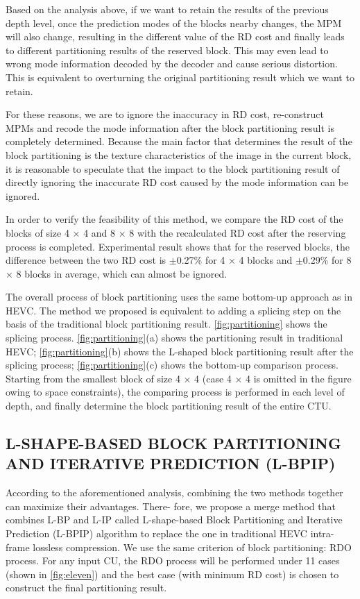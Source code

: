 \documentclass[journal]{IEEEtran}
\begin{document}
Based on the analysis above, if we want to retain the results of the previous depth level, once the prediction modes of the blocks nearby changes, the MPM will also change, resulting in the different value of the RD cost and finally leads to different partitioning results of the reserved block. This may even lead to wrong mode information decoded by the decoder and cause serious distortion. This is equivalent to overturning the original partitioning result which we want to retain.

For these reasons, we are to ignore the inaccuracy in RD cost, re-construct MPMs and recode the mode information after the block partitioning result is completely determined. Because the main factor that determines the result of the block partitioning is the texture characteristics of the image in the current block, it is reasonable to speculate that the impact to the block partitioning result of directly ignoring the inaccurate RD cost caused by the mode information can be ignored.

In order to verify the feasibility of this method, we compare the RD cost of the blocks of size 4 × 4 and 8 × 8 with the recalculated RD cost after the reserving process is completed. Experimental result shows that for the reserved blocks, the difference between the two RD cost is $\pm$0.27\% for 4 × 4 blocks and $\pm $0.29\% for 8 × 8 blocks in average, which can almost be ignored.

The overall process of block partitioning uses the same bottom-up approach as in HEVC. The method we proposed is equivalent to adding a splicing step on the basis of the traditional block partitioning result. \autoref{fig:partitioning} shows the splicing process. \autoref{fig:partitioning}(a) shows the partitioning result in traditional HEVC; \autoref{fig:partitioning}(b) shows the L-shaped block partitioning result after the splicing process; \autoref{fig:partitioning}(c) shows the bottom-up comparison process. Starting from the smallest block of size 4 × 4 (case 4 × 4 is omitted in the figure owing to space constraints), the comparing process is performed in each level of depth, and finally determine the block partitioning result of the entire CTU.

\subsection{L-SHAPE-BASED BLOCK PARTITIONING AND ITERATIVE PREDICTION (L-BPIP)}
According to the aforementioned analysis, combining the two methods together can maximize their advantages. There- fore, we propose a merge method that combines L-BP and L-IP called L-shape-based Block Partitioning and Iterative Prediction (L-BPIP) algorithm to replace the one in traditional HEVC intra-frame lossless compression. We use the same criterion of block partitioning: RDO process. For any input CU, the RDO process will be performed under 11 cases (shown in \autoref{fig:eleven}) and the best case (with minimum RD cost) is chosen to construct the final partitioning result.
\end{document}
